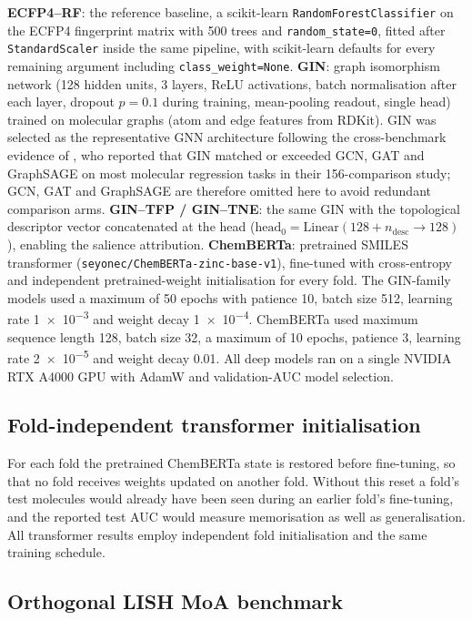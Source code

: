 \documentclass[11pt,a4paper]{article}
\begin{document}
\textbf{ECFP4--RF}: the reference baseline, a scikit-learn \texttt{RandomForestClassifier} on the ECFP4 fingerprint matrix with \num{500} trees and \texttt{random\_state=0}, fitted after \texttt{StandardScaler} inside the same pipeline, with scikit-learn defaults for every remaining argument including \texttt{class\_weight=None}. \textbf{GIN}: graph isomorphism network (\num{128} hidden units, \num{3} layers, ReLU activations, batch normalisation after each layer, dropout $p=\num{0.1}$ during training, mean-pooling readout, single head) trained on molecular graphs (atom and edge features from RDKit). GIN was selected as the representative GNN architecture following the cross-benchmark evidence of \citet{guo_ding_2026}, who reported that GIN matched or exceeded GCN, GAT and GraphSAGE on most molecular regression tasks in their \num{156}-comparison study; GCN, GAT and GraphSAGE are therefore omitted here to avoid redundant comparison arms. \textbf{GIN--TFP / GIN--TNE}: the same GIN with the topological descriptor vector concatenated at the head ($\mathrm{head}_0 = \mathrm{Linear}(\num{128} + n_{\mathrm{desc}} \to \num{128})$), enabling the salience attribution. \textbf{ChemBERTa}: pretrained SMILES transformer (\texttt{seyonec/ChemBERTa-zinc-base-v1}), fine-tuned with cross-entropy and independent pretrained-weight initialisation for every fold. The GIN-family models used a maximum of \num{50} epochs with patience \num{10}, batch size \num{512}, learning rate \num{1e-3} and weight decay \num{1e-4}. ChemBERTa used maximum sequence length \num{128}, batch size \num{32}, a maximum of \num{10} epochs, patience \num{3}, learning rate \num{2e-5} and weight decay \num{0.01}. All deep models ran on a single NVIDIA RTX A4000 GPU with AdamW and validation-AUC model selection.

\subsection{Fold-independent transformer initialisation}

For each fold the pretrained ChemBERTa state is restored before fine-tuning, so that no fold receives weights updated on another fold. Without this reset a fold's test molecules would already have been seen during an earlier fold's fine-tuning, and the reported test AUC would measure memorisation as well as generalisation. All transformer results employ independent fold initialisation and the same training schedule.

\subsection{Orthogonal LISH MoA benchmark}
\end{document}
